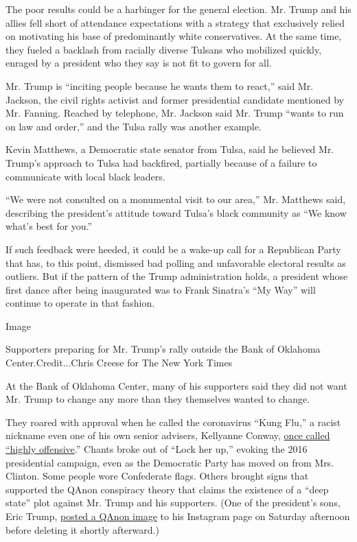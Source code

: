 The poor results could be a harbinger for the general election. Mr.
Trump and his allies fell short of attendance expectations with a
strategy that exclusively relied on motivating his base of predominantly
white conservatives. At the same time, they fueled a backlash from
racially diverse Tulsans who mobilized quickly, enraged by a president
who they say is not fit to govern for all.

Mr. Trump is ``inciting people because he wants them to react,'' said
Mr. Jackson, the civil rights activist and former presidential candidate
mentioned by Mr. Fanning. Reached by telephone, Mr. Jackson said Mr.
Trump ``wants to run on law and order,'' and the Tulsa rally was another
example.

Kevin Matthews, a Democratic state senator from Tulsa, said he believed
Mr. Trump's approach to Tulsa had backfired, partially because of a
failure to communicate with local black leaders.

``We were not consulted on a monumental visit to our area,'' Mr.
Matthews said, describing the president's attitude toward Tulsa's black
community as ``We know what's best for you.''

If such feedback were heeded, it could be a wake-up call for a
Republican Party that has, to this point, dismissed bad polling and
unfavorable electoral results as outliers. But if the pattern of the
Trump administration holds, a president whose first dance after being
inaugurated was to Frank Sinatra's ``My Way'' will continue to operate
in that fashion.

Image

Supporters preparing for Mr. Trump's rally outside the Bank of Oklahoma
Center.Credit...Chris Creese for The New York Times

At the Bank of Oklahoma Center, many of his supporters said they did not
want Mr. Trump to change any more than they themselves wanted to change.

They roared with approval when he called the coronavirus ``Kung Flu,'' a
racist nickname even one of his own senior advisers, Kellyanne Conway,
\href{https://thehill.com/homenews/administration/488276-kellyanne-conway-says-its-highly-offensive-to-refer-to-coronavirus-as}{once
called ``highly offensive}.'' Chants broke out of ``Lock her up,''
evoking the 2016 presidential campaign, even as the Democratic Party has
moved on from Mrs. Clinton. Some people wore Confederate flags. Others
brought signs that supported the QAnon conspiracy theory that claims the
existence of a ``deep state'' plot against Mr. Trump and his supporters.
(One of the president's sons, Eric Trump,
\href{https://twitter.com/jaredlholt/status/1274415729333415938?s=20}{posted
a QAnon image} to his Instagram page on Saturday afternoon before
deleting it shortly afterward.)

